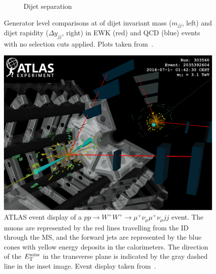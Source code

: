 \begin{figure}[htbp]
\begin{subfigure}[b]{.4842\textwidth}
    \caption{Dijet separation}
    \label{fig:ssww13tev_dijet_comparison_dyjj}
  \end{subfigure}
  \caption[Generator level comparisons at  of dijet invariant mass ($m_{jj}$, left) and dijet rapidity ($\Delta y_{jj}$, right) in EWK (red) and QCD (blue) \ssww events with no selection cuts applied.]{Generator level comparisons at  of dijet invariant mass ($m_{jj}$, left) and dijet rapidity ($\Delta y_{jj}$, right) in EWK (red) and QCD (blue) \ssww events with no selection cuts applied.  Plots taken from~\cite{2017.physics-opportunities-100tev}.}
  \label{fig:ssww13tev_dijet_comparison}
\end{figure}

\begin{figure}[htbp]
  \centering
  \includegraphics[width=.95\textwidth]{figs/ssww_13tev/introduction/evtdisplay_mm}
  \caption[ATLAS event display of a $pp\rightarrow W^{+}W^{+}\rightarrow\mu^{+}\nu_\mu\mu^{+}\nu_\mu jj$ event.  The muons are represented by the red lines travelling from the ID through the MS, and the forward jets are represented by the blue cones with yellow energy deposits in the calorimeters.  The direction of the $\met$ in the transverse plane is indicated by the gray dashed line in the inset image.]{ATLAS event display of a $pp\rightarrow W^{+}W^{+}\rightarrow\mu^{+}\nu_\mu\mu^{+}\nu_\mu jj$ event.  The muons are represented by the red lines travelling from the ID through the MS, and the forward jets are represented by the blue cones with yellow energy deposits in the calorimeters.  The direction of the $\met$ in the transverse plane is indicated by the gray dashed line in the inset image.  Event display taken from~\cite{2018.ssww-13tev-atlas-conf}.}
  \label{fig:ssww13tev_event_display_mm}
\end{figure}


